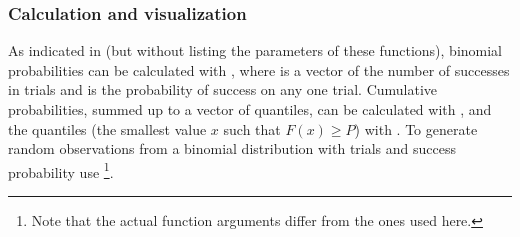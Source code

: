 \documentclass[10pt,krantz2]{krantz}\usepackage[]{graphicx}\usepackage[]{color}
\begin{document}

\subsubsection{Calculation and visualization}
As indicated in  (but without listing the
parameters of these functions),
binomial probabilities
can be calculated with ,
where  is a vector of the number of successes in 
trials and  is the probability of success on any one trial.
Cumulative probabilities, summed up to a vector of quantiles, 
can be calculated with ,
and the quantiles (the smallest value $x$ such that $F(x) \ge P$)
with .
To generate  random observations from a binomial distribution
with  trials and success probability 
use \footnote{Note that the actual \R function
  arguments differ from the ones used here.}.
\end{document}
